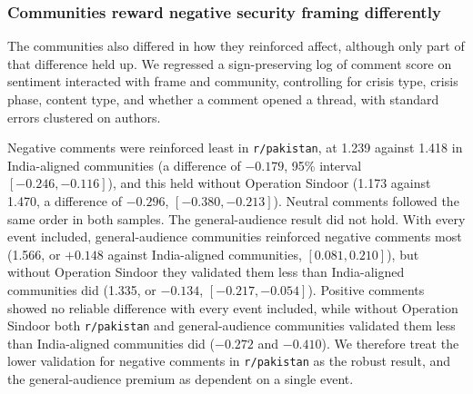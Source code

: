 \subsubsection{Communities reward negative security framing differently}
\label{sec:results-reward}

The communities also differed in how they reinforced affect, although only part of that difference held up. We regressed a sign-preserving log of comment score on sentiment interacted with frame and community, controlling for crisis type, crisis phase, content type, and whether a comment opened a thread, with standard errors clustered on authors. 


Negative comments were reinforced least in \texttt{r/pakistan}, at 1.239 against 1.418 in India-aligned communities (a difference of $-0.179$, 95\% interval $[-0.246, -0.116]$), and this held without Operation Sindoor (1.173 against 1.470, a difference of $-0.296$, $[-0.380, -0.213]$). Neutral comments followed the same order in both samples. The general-audience result did not hold. With every event included, general-audience communities reinforced negative comments most (1.566, or $+0.148$ against India-aligned communities, $[0.081, 0.210]$), but without Operation Sindoor they validated them less than India-aligned communities did (1.335, or $-0.134$, $[-0.217, -0.054]$). Positive comments showed no reliable difference with every event included, while without Operation Sindoor both \texttt{r/pakistan} and general-audience communities validated them less than India-aligned communities did ($-0.272$ and $-0.410$). We therefore treat the lower validation for negative comments in \texttt{r/pakistan} as the robust result, and the general-audience premium as dependent on a single event.

